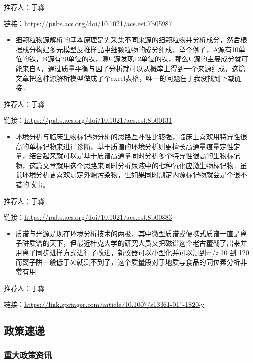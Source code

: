 \documentclass[]{book}
\providecommand{\tightlist}{%
  \setlength{\itemsep}{0pt}\setlength{\parskip}{0pt}}
\begin{document}
推荐人：于淼

链接：\url{https://pubs.acs.org/doi/10.1021/acs.est.7b05987}

\begin{itemize}
\tightlist
\item
  细颗粒物源解析的基本原理是先采集不同来源的细颗粒物并分析成分，然后根据成分构建多元模型反推样品中细颗粒物的成分组成，举个例子，A源有10单位的铁，B源有20单位的铁，测C源发现12单位的铁，那么C源的主要成分就可能来自A，通过质量平衡与因子分析就可以从概率上得到一个来源组成，这篇文章把这种源解析模型做成了个excel表格，唯一的问题在于我没找到下载链接\ldots{}
\end{itemize}

推荐人：于淼

链接：\url{https://pubs.acs.org/doi/10.1021/acs.est.8b00131}

\begin{itemize}
\tightlist
\item
  环境分析与临床生物标记物分析的思路互补性比较强，临床上喜欢用特异性很高的单标记物来进行诊断，基于质谱的环境分析则更擅长高通量痕量定性定量，结合起来就可以是基于质谱高通量同时分析多个特异性很高的生物标记物，这篇文章就用这个思路来同时分析尿液中的七种氧化应激生物标记物，虽说环境分析更喜欢测定外源污染物，但如果同时测定内源标记物就会是个很不错的故事。
\end{itemize}

推荐人：于淼

链接：\url{https://pubs.acs.org/doi/10.1021/acs.est.8b00883}

\begin{itemize}
\tightlist
\item
  质谱与光源是现在环境分析技术的两极，其中微型质谱或便携式质谱一直是离子阱质谱的天下，但最近杜克大学的研究人员又把磁谱这个老古董翻了出来并用离子同步进样方式进行了改进，新仪器可以小型化并可以测到m/z
  10 到
  120而离子阱一般低于50就测不到了，这个质量段对于地质与食品的同位素分析非常有用
\end{itemize}

推荐人：于淼

链接：\url{https://link.springer.com/article/10.1007/s13361-017-1820-y}

\subsection*{政策速递}\label{-1}

\subsubsection*{重大政策资讯}\label{-1}
\end{document}
